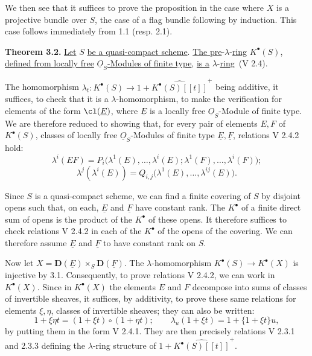 We then see that it suffices to prove the proposition in the case where \(X\) is a projective bundle over \(S\), the case of a flag bundle following by induction. This case follows immediately from 1.1 (resp. 2.1).

\textbf{Theorem 3.2.} \uline{Let} \(S\) \uline{be a quasi-compact scheme}. \uline{The pre}-\(\lambda\)-\uline{ring} \(K^{\bullet}(S)\), \uline{defined from locally free} \(\underline{O}_S\)\uline{-Modules of finite type}, \uline{is a} \(\lambda\)-\uline{ring}~(V 2.4).

The homomorphism \(\lambda_t:K^{\bullet}(S)\longrightarrow 1+\widehat{K^{\bullet}(S)[[t]]}^{+}\) being additive, it suffices, to check that it is a \(\lambda\)-homomorphism, to make the verification for elements of the form \(\cl(\underline{E})\), where \(\underline{E}\) is a locally free \(\underline{O}_S\)-Module of finite type. We are therefore reduced to showing that, for every pair of elements \(E,F\) of \(K^{\bullet}(S)\), classes of locally free \(\underline{O}_S\)-Modules of finite type \(\underline{E},\underline{F}\), relations V 2.4.2 hold:
\[
  \lambda^i(EF)=P_i\bigl(\lambda^1(E),\ldots,\lambda^i(E);\lambda^1(F),\ldots,\lambda^i(F)\bigr);
\]
\[
  \lambda^j(\lambda^i(E))=Q_{i,j}\bigl(\lambda^1(E),\ldots,\lambda^{ij}(E)\bigr).
\]

Since \(S\) is a quasi-compact scheme, we can find a finite covering of \(S\) by disjoint opens such that, on each, \(\underline{E}\) and \(\underline{F}\) have constant rank. The \(K^{\bullet}\) of a finite direct sum of opens is the product of the \(K^{\bullet}\) of these opens. It therefore suffices to check relations V 2.4.2 in each of the \(K^{\bullet}\) of the opens of the covering. We can therefore assume \(\underline{E}\) and \(\underline{F}\) to have constant rank on \(S\).

%
Now let \(X=\mathbf D(\underline{E})\times_S \mathbf D(\underline{F})\). The \(\lambda\)-homomorphism \(K^{\bullet}(S)\to K^{\bullet}(X)\) is injective by 3.1. Consequently, to prove relations V 2.4.2, we can work in \(K^{\bullet}(X)\). Since in \(K^{\bullet}(X)\) the elements \(E\) and \(F\) decompose into sums of classes of invertible sheaves, it suffices, by additivity, to prove these same relations for elements \(\xi,\eta\), classes of invertible sheaves; they can also be written:
\[
  1+\xi\eta t=(1+\xi t)\circ(1+\eta t);
  \qquad
  \lambda_u(1+\xi t)=1+\{1+\xi t\}u,
\]
by putting them in the form V 2.4.1. They are then precisely relations V 2.3.1 and 2.3.3 defining the \(\lambda\)-ring structure of \(1+\widehat{K^{\bullet}(S)[[t]]}^{+}\).

